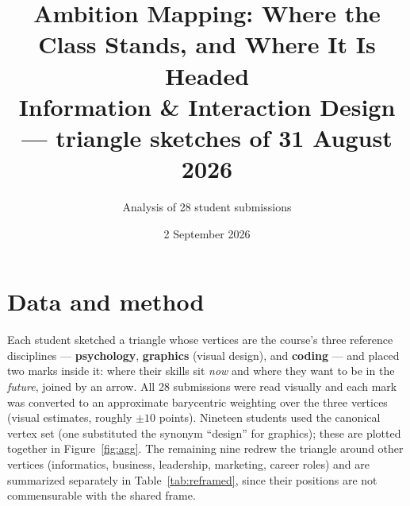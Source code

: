 \documentclass[11pt]{article}
\title{Ambition Mapping: Where the Class Stands, and Where It Is Headed\\
\large Information \& Interaction Design --- triangle sketches of 31 August 2026}
\author{Analysis of 28 student submissions}
\date{2 September 2026}
\begin{document}
\maketitle

\section*{Data and method}
Each student sketched a triangle whose vertices are the course's three reference
disciplines --- \textbf{psychology}, \textbf{graphics} (visual design), and
\textbf{coding} --- and placed two marks inside it: where their skills sit
\emph{now} and where they want to be in the \emph{future}, joined by an arrow.
All 28 submissions were read visually and each mark was converted to an
approximate barycentric weighting over the three vertices (visual estimates,
roughly $\pm 10$ points). Nineteen students used the canonical vertex set (one
substituted the synonym ``design'' for graphics); these are plotted together in
Figure~\ref{fig:agg}. The remaining nine redrew the triangle around other
vertices (informatics, business, leadership, marketing, career roles) and are
summarized separately in Table~\ref{tab:reframed}, since their positions are
not commensurable with the shared frame.
\end{document}
